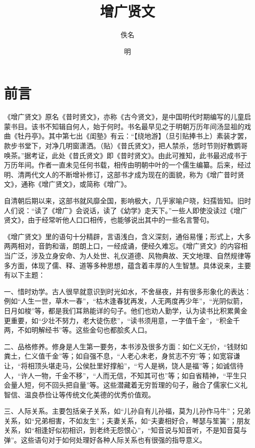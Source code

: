 \documentclass[12pt,UTF8]{ctexbook}
\title{\heiti\zihao{0} 增广贤文}
\author{佚名}
\date{明}
\begin{document}
\maketitle
\tableofcontents

\frontmatter

\chapter{前言}

《增广贤文》原名《昔时贤文》，亦称《古今贤文》，是中国明代时期编写的儿童启蒙书目。该书不知辑自何人，始于何时。书名最早见之于明朝万历年间汤显祖的戏曲《牡丹亭》。其中第七出《闺塾》有云：“【绕地游】（旦引贴捧书上）素装才罢，款步书堂下，对净几明窗潇洒。（贴）《昔氏贤文》，把人禁杀，恁时节则好教鹦哥唤茶。”据考证，此处《昔氏贤文》即《昔时贤文》。由此可推知，此书最迟成书于万历年间。作者一直未见任何书载，相传由明朝中叶的一个儒生编纂。后来，经过明、清两代文人的不断增补修订，这部书才成为现在的面貌，称为《增广昔时贤文》，通称《增广贤文》，或简称《增广》。

自清朝后期以来，这部书就风靡全国，影响极大，几乎家喻户晓，妇孺皆知。旧时人们说：“读了《增广》会说话，读了《幼学》走天下。”一些人即使没读过《增广贤文》，由于经常听他人口口相传，也能够说出其中的一些名言警句。

《增广贤文》里的语句十分精辟，言语浅白，含义深刻，通俗易懂；形式上，大多两两相对，音韵和谐，朗朗上口，一经成诵，便经久难忘。《增广贤文》的内容相当广泛，涉及立身安命、为人处世、礼仪道德、风物典故、天文地理、自然规律等多方面，体现了儒、释、道等多种思想，蕴含着丰厚的人生智慧。具体说来，主要有以下主题：

一、惜时劝学。古人很早就意识到时光如水，不舍昼夜，并有很多形象化的表达：例如“人生一世，草木一春”，“枯木逢春犹再发，人无两度再少年”，“光阴似箭，日月如梭”等，都是我们耳熟能详的句子。他们也劝人勤学，认为读书比积累黄金更重要，如“少壮不努力，老大徒伤悲”，“读书须用意，一字值千金”，“积金千两，不如明解经书”等。这些金句也都脍炙人口。

二、品格修养。修身是人生第一要务，本书涉及很多方面：如仁义无价，“钱财如粪土，仁义值千金”等；如自强不息，“人老心未老，身贫志不穷”等；如宽容谦让，“将相顶头堪走马，公侯肚里好撑船”，“亏人是祸，饶人是福”等；如诚信待人，“许人一物，千金不移”，“人而无信，不知其可也”等；如自省精神，“平生只会量人短，何不回头把自量”等。这些潜藏着无穷哲理的句子，融合了儒家仁义礼智信、温良恭俭让等传统文化美德的优秀价值观。

三、人际关系。主要包括亲子关系，如“儿孙自有儿孙福，莫为儿孙作马牛”；兄弟关系，如“兄弟相害，不如友生”；夫妻关系，如“夫妻相好合，琴瑟与笙簧”；朋友关系，如“相逢好似初相识，到老终无怨恨心”，“知音说与知音听，不是知音莫与弹”。这些语句对于如何处理好各种人际关系也有很强的指导意义。
\end{document}
